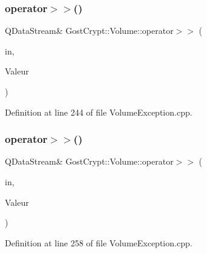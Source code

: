 \subsubsection{\texorpdfstring{operator$>$$>$()}{operator>>()}\hspace{0.1cm}{\footnotesize\ttfamily [17/19]}}
{\footnotesize\ttfamily Q\+Data\+Stream\& Gost\+Crypt\+::\+Volume\+::operator$>$$>$ (\begin{DoxyParamCaption}\item[{Q\+Data\+Stream \&}]{in,  }\item[{\hyperlink{class_gost_crypt_1_1_volume_1_1_password_or_keyfiles_incorrect}{Gost\+Crypt\+::\+Volume\+::\+Password\+Or\+Keyfiles\+Incorrect} \&}]{Valeur }\end{DoxyParamCaption})}



Definition at line 244 of file Volume\+Exception.\+cpp.

\mbox{\label{namespace_gost_crypt_1_1_volume_a478dc4d109f6644f530ad7942c0b3a2a}} 
\subsubsection{\texorpdfstring{operator$>$$>$()}{operator>>()}\hspace{0.1cm}{\footnotesize\ttfamily [18/19]}}
{\footnotesize\ttfamily Q\+Data\+Stream\& Gost\+Crypt\+::\+Volume\+::operator$>$$>$ (\begin{DoxyParamCaption}\item[{Q\+Data\+Stream \&}]{in,  }\item[{\hyperlink{class_gost_crypt_1_1_volume_1_1_data_not_mutable}{Gost\+Crypt\+::\+Volume\+::\+Data\+Not\+Mutable} \&}]{Valeur }\end{DoxyParamCaption})}



Definition at line 258 of file Volume\+Exception.\+cpp.

\mbox{\label{namespace_gost_crypt_1_1_volume_a5dd91e6488caa4050088dfee8fbf9c86}} 
